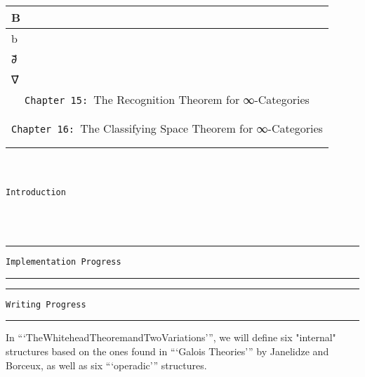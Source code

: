 \documentclass{book}
\theoremstyle{definition}
\renewcommand{\chapter}[1]{
\newpage
{
\Huge 
\begin{center}
\ \\
\ \\
\thispagestyle{empty}
\texttt{#1}
\end{center}}
\ \\
\ \\
}
\begin{document}
{\begin{longtable}{|| l || l ||}
B⃗ & \\
\hline
b⃗ & \\
 \hline
∂⃗ & \\
\hline
∇⃗ & \\
\hline \hline
\multicolumn{2}{||c||}{\texttt{Chapter 15: }The Recognition Theorem for ∞-Categories} \\
\hline \hline
 & \\
\hline
 & \\
\hline \hline
\multicolumn{2}{||c||}{\texttt{Chapter 16: }The Classifying Space Theorem for ∞-Categories} \\
\hline \hline
 & \\
\hline
 & \\
\hline \hline
\end{longtable}
}

\chapter{Introduction}

\noindent\textcolor{Red}{\rule{16cm}{1mm}}
\begin{center}
\texttt{Implementation Progress}
\end{center}
\noindent\textcolor{Red}{\rule{16cm}{1mm}}

\noindent\textcolor{Red}{\rule{16cm}{1mm}}
\begin{center}
\texttt{Writing Progress}
\end{center}
\noindent\textcolor{Red}{\rule{16cm}{1mm}}

\iffalse
https://mathoverflow.net/questions/57589/heuristic-behind-a-infty-algebras
\fi


In ```TheWhiteheadTheoremandTwoVariations''', we will define six "internal" structures based on the ones found in ```Galois Theories''' by Janelidze and Borceux, as well as six ```operadic''' structures.

\iffalse
Ω⃗, Ω⃡, Ω⃗₀, Ω⃡₀ are the ones I construct and Ω Mathlib's.
\fi
\end{document}
